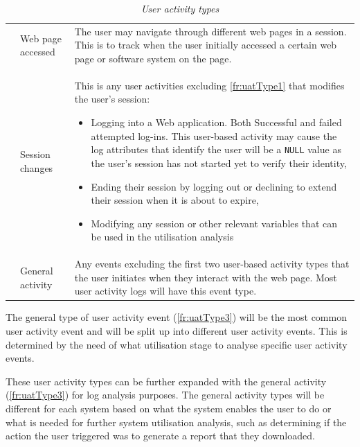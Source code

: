 \begin{table}[!htb]
	\centering
	\caption[User activity types]
	{\textit{User activity types}}
	\label{tbl:ch2_userActivityTypes}
	\begin{tabularx}{\textwidth}{llX}
		\toprule
		\thead{Requirement ID} & \thead{Activity Type} & \thead{Description} \\
		\midrule

		\rowcolor{lightgray}
		\subsubphase{fr:uatType1} & Web page accessed & The user may navigate through different web pages in a session. This is to track when the user initially accessed a certain web page or software system on the page.\\


		\subsubphase{fr:uatType2} & Session changes & This is any user activities excluding \ref{fr:uatType1} that modifies the user's session:
		\begin{itemize}
			\item Logging into a Web application. Both Successful and failed attempted log-ins. This user-based activity may cause the log attributes that identify the user will be a \texttt{NULL} value as the user's session has not started yet to verify their identity,
			\item Ending their session by logging out or declining to extend their session when it is about to expire,
			\item Modifying any session or other relevant variables that can be used in the utilisation analysis
		\end{itemize}\\

		\rowcolor{lightgray}
		\subsubphase{fr:uatType3} & General activity & Any events excluding the first two user-based activity types that the user initiates when they interact with the web page. Most user activity logs will
		have this event type.\\ 
		\bottomrule
	\end{tabularx}
\end{table}

The general type of user activity event (\ref{fr:uatType3}) will be the most common user activity event and will be split up into different user activity events. This is determined by the need of what utilisation stage to analyse specific user activity events. \par These user activity types can be further expanded with the general activity (\ref{fr:uatType3}) for log analysis purposes. The general activity types will be different for each system based on what the system enables the user to do or what is needed for further system utilisation analysis, such as determining if the action the user triggered was to generate a report that they downloaded.

